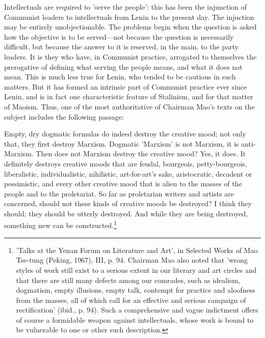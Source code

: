 Intellectuals are required to 'serve the people': this has been the injunction of Communist leaders to intellectuals from Lenin to the present day. The injuction may be entirely unobjectionable. The problems begin when the question is asked how the objective is to be served—not because the question is necessarily difficult, but because the answer to it is reserved, in the main, to the party leaders. It is they who have, in Communist practice, arrogated to themselves the prerogative of defining what serving the people means, and what it does not mean. This is much less true for Lenin, who tended to be cautious in such matters. But it has formed an intrinsic part of Communist practice ever since Lenin, and is in fact one characteristic feature of Stalinism, and for that matter of Maoism. Thus, one of the most authoritative of Chairman Mao's texts on the subject includes the following passage:
\begin{displayquote}
    Empty, dry dogmatic formulas do indeed destroy the creative mood; not only that, they first destroy Marxism. Dogmatic 'Marxism' is not Marxism, it is anti-Marxism. Then does not Marxism destroy the creative mood? Yes, it does. It definitely destroys creative moods that are feudal, bourgeois, petty-bourgeois, liberalistic, individualistic, nihilistic, art\hyp{}for\hyp{}art's sake, aristocratic, decadent or pessimistic, and every other creative mood that is alien to the masses of the people and to the proletariat. So far as proletarian writers and artists are concerned,  should not these kinds of creative moods be destroyed? I think they should; they should be utterly destroyed. And while they are being destroyed, something new can be constructed.\footnote{'Talks at the Yenan Forum on Literature and Art', in Selected Works of Mao Tse-tung (Peking, 1967), III, p. 94. Chairman Mao also noted that 'wrong styles of work still exist to a serious extent in our literary and art circles and that there are still many defects among our comrades, such as idealism, dogmatism, empty illusions, empty talk, contempt for practice and aloofness from the masses, all of which call for an effective and serious campaign of rectification' (ibid., p. 94). Such a comprehensive and vague indictment offers of course a formidable weapon against intellectuals, whose work is bound to be vulnerable to one or other such description.}
\end{displayquote}

